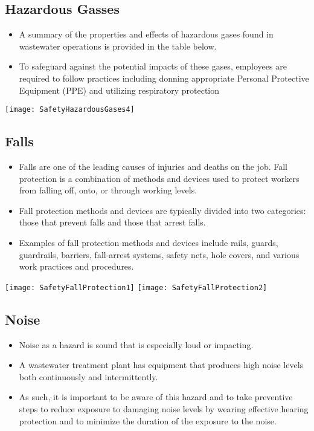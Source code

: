 \begin{itemize}
\subsection{Hazardous Gasses}
\begin{itemize}
\item A summary of the properties and effects of hazardous gases found in wastewater operations is provided in the table below.
\item To safeguard against the potential impacts of these gases, employees are required to follow practices including donning appropriate Personal Protective Equipment (PPE) and utilizing respiratory protection\\
\end{itemize}
\begin{center}
\texttt{[image: SafetyHazardousGases4]}\\ 
\end{center}

\subsection{Falls}
\begin{itemize}
\item Falls are one of the leading causes of injuries and deaths on the job.  Fall protection is a combination of methods and devices used to protect workers from falling off, onto, or through working levels. 
\item Fall protection methods and devices are typically divided into two categories: those that prevent falls and those that arrest falls. 
\item Examples of fall protection methods and devices include rails, guards, guardrails, barriers, fall-arrest systems, safety nets, hole covers, and various work practices and procedures.
\end{itemize}
\begin{center}
\texttt{[image: SafetyFallProtection1]}\hspace{1cm} \texttt{[image: SafetyFallProtection2]}\\
\end{center}
\subsection{Noise}
\begin{itemize}
\item Noise as a hazard is sound that is especially loud or impacting. 
\item A wastewater treatment plant has equipment that produces high noise levels both continuously and intermittently. 
\item As such, it is important to be aware of this hazard and to take preventive steps to reduce exposure to damaging noise levels by wearing effective hearing protection and to minimize the duration of the exposure to the noise.
\end{itemize}


\end{itemize}
